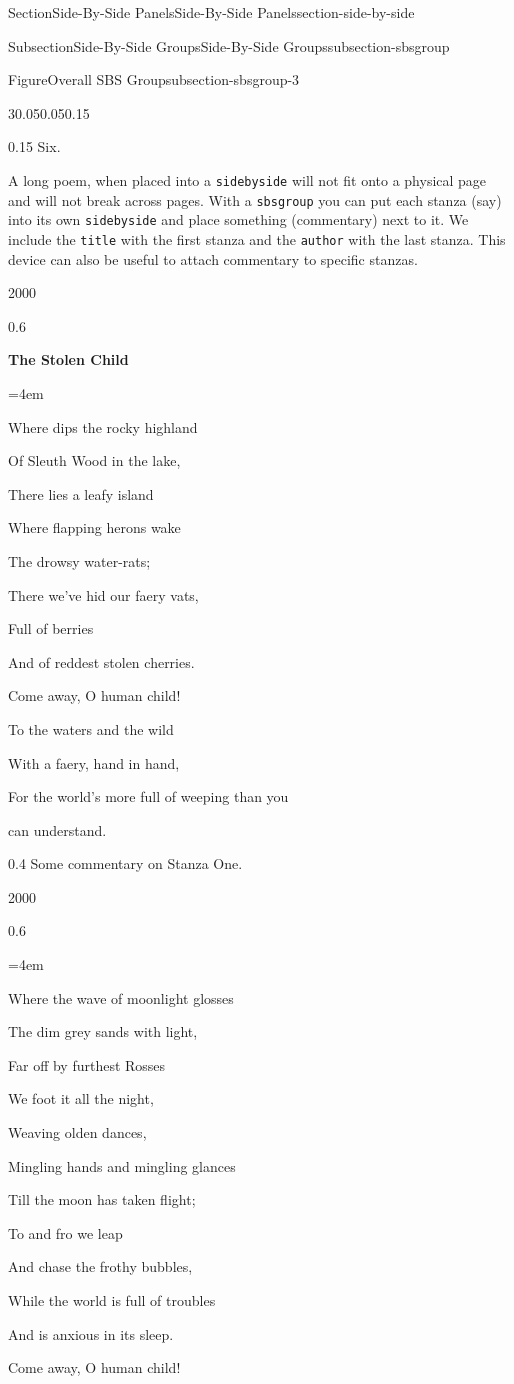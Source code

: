\documentclass[twoside,10pt,]{article}
\newcommand{\mono}[1]{\texttt{#1}}
\numberwithin{equation}{section}
\newenvironment{poem}{\setlength{\parindent}{0em}}{}
\newcommand{\poemTitle}[1]{\begin{center}\large\textbf{#1}\end{center}}
\newenvironment{stanza}{\vspace{0.25 em}\hangindent=4em}{\vspace{1 em}}
\newcommand{\poemlineleft}[1]{{\raggedright{#1}\par}\vspace{-\parskip}}
\begin{document}
\begin{sectionptx}{Section}{Side-By-Side Panels}{}{Side-By-Side Panels}{}{}{section-side-by-side}
\begin{subsectionptx}{Subsection}{Side-By-Side Groups}{}{Side-By-Side Groups}{}{}{subsection-sbsgroup}
\begin{figureptx}{Figure}{Overall SBS Group}{subsection-sbsgroup-3}{}
\begin{sidebyside}{3}{0.05}{0.05}{0.15}
\begin{sbspanel}{0.15}
Six.%
\end{sbspanel}%
\end{sidebyside}%
\tcblower
\end{figureptx}%
A long poem, when placed into a \mono{sidebyside} will not fit onto a physical page and will not break across pages.  With a \mono{sbsgroup} you can put each stanza (say) into its own \mono{sidebyside} and place something (commentary) next to it.  We include the \mono{title} with the first stanza and the \mono{author} with the last stanza.  This device can also be useful to attach commentary to specific stanzas.%
\begin{sidebyside}{2}{0}{0}{0}%
\begin{sbspanel}{0.6}%
\begin{poem}%
\poemTitle{The Stolen Child}
%
\begin{stanza}
\poemlineleft{Where dips the rocky highland}
\poemlineleft{Of Sleuth Wood in the lake,}
\poemlineleft{There lies a leafy island}
\poemlineleft{Where flapping herons wake}
\poemlineleft{The drowsy water-rats;}
\poemlineleft{There we've hid our faery vats,}
\poemlineleft{Full of berries}
\poemlineleft{And of reddest stolen cherries.}
\poemlineleft{Come away, O human child!}
\poemlineleft{To the waters and the wild}
\poemlineleft{With a faery, hand in hand,}
\poemlineleft{For the world's more full of weeping than you}
\poemlineleft{can understand.}
\end{stanza}
\end{poem}
\end{sbspanel}%
\begin{sbspanel}{0.4}%
Some commentary on Stanza One.%
\end{sbspanel}%
\end{sidebyside}%
\begin{sidebyside}{2}{0}{0}{0}%
\begin{sbspanel}{0.6}%
\begin{poem}%
\poemTitle{}
\begin{stanza}
\poemlineleft{Where the wave of moonlight glosses}
\poemlineleft{The dim grey sands with light,}
\poemlineleft{Far off by furthest Rosses}
\poemlineleft{We foot it all the night,}
\poemlineleft{Weaving olden dances,}
\poemlineleft{Mingling hands and mingling glances}
\poemlineleft{Till the moon has taken flight;}
\poemlineleft{To and fro we leap}
\poemlineleft{And chase the frothy bubbles,}
\poemlineleft{While the world is full of troubles}
\poemlineleft{And is anxious in its sleep.}
\poemlineleft{Come away, O human child!}

\end{stanza}
\end{poem}
\end{sbspanel}
\end{sidebyside}
\end{subsectionptx}
\end{sectionptx}
\end{document}
